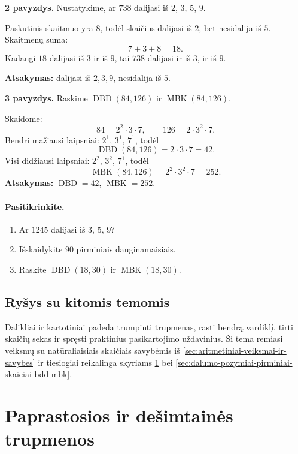 \textbf{2 pavyzdys.} Nustatykime, ar \(738\) dalijasi iš \(2\), \(3\), \(5\), \(9\).

Paskutinis skaitmuo yra \(8\), todėl skaičius dalijasi iš \(2\), bet nesidalija iš \(5\). Skaitmenų suma:
\[
7+3+8=18.
\]
Kadangi \(18\) dalijasi iš \(3\) ir iš \(9\), tai \(738\) dalijasi ir iš \(3\), ir iš \(9\).

\textbf{Atsakymas:} dalijasi iš \(2,3,9\), nesidalija iš \(5\).

\textbf{3 pavyzdys.} Raskime \(\operatorname{DBD}(84,126)\) ir \(\operatorname{MBK}(84,126)\).

Skaidome:
\[
84=2^2\cdot 3\cdot 7,\qquad 126=2\cdot 3^2\cdot 7.
\]
Bendri mažiausi laipsniai: \(2^1\), \(3^1\), \(7^1\), todėl
\[
\operatorname{DBD}(84,126)=2\cdot 3\cdot 7=42.
\]
Visi didžiausi laipsniai: \(2^2\), \(3^2\), \(7^1\), todėl
\[
\operatorname{MBK}(84,126)=2^2\cdot 3^2\cdot 7=252.
\]
\textbf{Atsakymas:} \(\operatorname{DBD}=42\), \(\operatorname{MBK}=252\).

\paragraph{Pasitikrinkite.}
\begin{enumerate}[label=\arabic*.]
\item Ar \(1245\) dalijasi iš \(3\), \(5\), \(9\)?
\item Išskaidykite \(90\) pirminiais dauginamaisiais.
\item Raskite \(\operatorname{DBD}(18,30)\) ir \(\operatorname{MBK}(18,30)\).
\end{enumerate}

\subsection{Ryšys su kitomis temomis}
Dalikliai ir kartotiniai padeda trumpinti trupmenas, rasti bendrą vardiklį, tirti skaičių sekas ir spręsti praktinius pasikartojimo uždavinius. Ši tema remiasi veiksmų su natūraliaisiais skaičiais savybėmis iš \ref{sec:aritmetiniai-veiksmai-ir-savybes} ir tiesiogiai reikalinga skyriams \ref{sec:paprastosios-ir-desimtaines-trupmenos} bei \ref{sec:dalumo-pozymiai-pirminiai-skaiciai-bdd-mbk}.

\section{Paprastosios ir dešimtainės trupmenos}\label{sec:paprastosios-ir-desimtaines-trupmenos}

